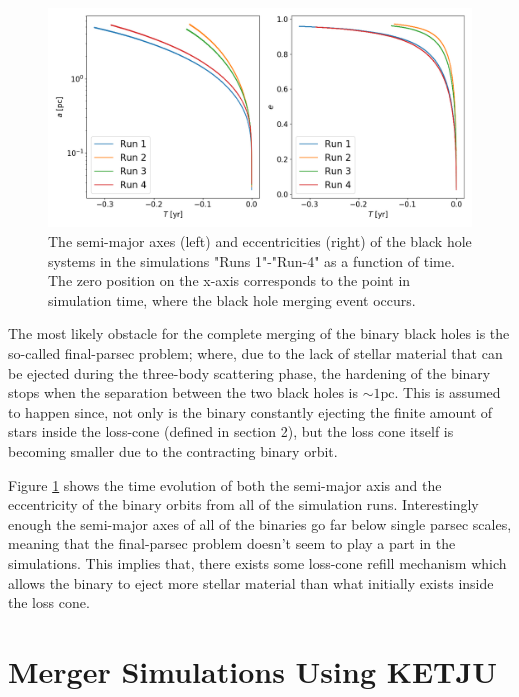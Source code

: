 \documentclass[english, oneside]{HYgradu}
\begin{document}
\begin{figure}[h]
	\centering
	\includegraphics[width=\textwidth]{semi_major_and_ecc.png}
	\caption{The semi-major axes (left) and eccentricities (right) of the black hole systems in the simulations "Runs 1"-"Run-4" as a function of time. The zero position on the x-axis corresponds to the point in simulation time, where the black hole merging event occurs.}
	\label{figure:semi_and_ecc}
\end{figure}

The most likely obstacle for the complete merging of the binary black holes is the so-called final-parsec problem; where, due to the lack of stellar material that can be ejected during the three-body scattering phase, the hardening of the binary stops when the separation between the two black holes is $\sim 1 \mathrm{pc}$. This is assumed to happen since, not only is the binary constantly ejecting the finite amount of stars inside the loss-cone (defined in section 2), but the loss cone itself is becoming smaller due to the contracting binary orbit.

Figure \ref{figure:semi_and_ecc} shows the time evolution of both the semi-major axis and the eccentricity of the binary orbits from all of the simulation runs. Interestingly enough the semi-major axes of all of the binaries go far below single parsec scales, meaning that the final-parsec problem doesn't seem to play a part in the simulations. This implies that, there exists some loss-cone refill mechanism which allows the binary to eject more stellar material than what initially exists inside the loss cone.



\chapter{Merger Simulations Using KETJU}
\end{document}
